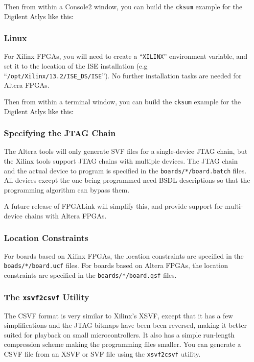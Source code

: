 \newpage
Then from within a Console2 window, you can build the \texttt{cksum} example for the Digilent Atlys like this:


\subsubsection{Linux}
For Xilinx FPGAs, you will need to create a ``\texttt{XILINX}'' environment variable, and set it to the location of the ISE installation (e.g ``\texttt{/opt/Xilinx/13.2/ISE\_DS/ISE}''). No further installation tasks are needed for Altera FPGAs.

Then from within a terminal window, you can build the \texttt{cksum} example for the Digilent Atlys like this:


\subsubsection{Specifying the JTAG Chain}
The Altera tools will only generate SVF files for a single-device JTAG chain, but the Xilinx tools support JTAG chains with multiple devices. The JTAG chain and the actual device to program is specified in the \texttt{boards/*/board.batch} files. All devices except the one being programmed need BSDL descriptions so that the programming algorithm can bypass them.

A future release of FPGALink will simplify this, and provide support for multi-device chains with Altera FPGAs.

\subsubsection{Location Constraints}
For boards based on Xilinx FPGAs, the location constraints are specified in the \texttt{boads/*/board.ucf} files. For boards based on Altera FPGAs, the location constraints are specified in the \texttt{boards/*/board.qsf} files.

\subsubsection{The \texttt{xsvf2csvf} Utility}
The CSVF format is very similar to Xilinx's XSVF, except that it has a few simplifications and the JTAG bitmaps have been been reversed, making it better suited for playback on small microcontrollers. It also has a simple run-length compression scheme making the programming files smaller. You can generate a CSVF file from an XSVF or SVF file using the \texttt{xsvf2csvf} utility.

